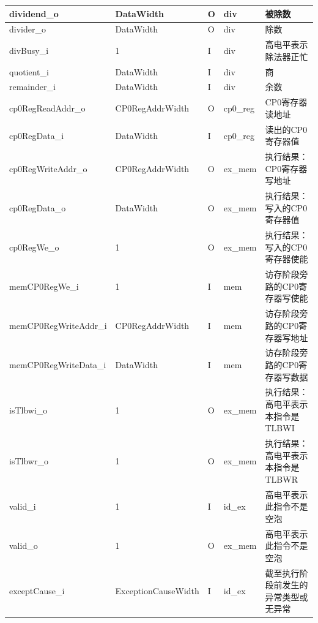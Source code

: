 \documentclass{article}
\begin{document}
\begin{spacing}{1.4}
\begin{longtable}{l|l|l|l|p{5cm}}
\hline dividend\_o             & DataWidth              & O     & div           & 被除数 \\
\hline divider\_o              & DataWidth              & O     & div           & 除数 \\
\hline divBusy\_i              & 1                      & I     & div           & 高电平表示除法器正忙 \\
\hline quotient\_i             & DataWidth              & I     & div           & 商 \\
\hline remainder\_i            & DataWidth              & I     & div           & 余数 \\
\hline cp0RegReadAddr\_o       & CP0RegAddrWidth        & O     & cp0\_reg      & CP0寄存器读地址 \\
\hline cp0RegData\_i           & DataWidth              & I     & cp0\_reg      & 读出的CP0寄存器值 \\
\hline cp0RegWriteAddr\_o      & CP0RegAddrWidth        & O     & ex\_mem       & 执行结果：CP0寄存器写地址 \\
\hline cp0RegData\_o           & DataWidth              & O     & ex\_mem       & 执行结果：写入的CP0寄存器值 \\
\hline cp0RegWe\_o             & 1                      & O     & ex\_mem       & 执行结果：写入的CP0寄存器使能 \\
\hline memCP0RegWe\_i          & 1                      & I     & mem           & 访存阶段旁路的CP0寄存器写使能 \\
\hline memCP0RegWriteAddr\_i   & CP0RegAddrWidth        & I     & mem           & 访存阶段旁路的CP0寄存器写地址 \\
\hline memCP0RegWriteData\_i   & DataWidth              & I     & mem           & 访存阶段旁路的CP0寄存器写数据 \\
\hline isTlbwi\_o              & 1                      & O     & ex\_mem       & 执行结果：高电平表示本指令是TLBWI \\
\hline isTlbwr\_o              & 1                      & O     & ex\_mem       & 执行结果：高电平表示本指令是TLBWR \\
\hline valid\_i                & 1                      & I     & id\_ex        & 高电平表示此指令不是空泡 \\
\hline valid\_o                & 1                      & O     & ex\_mem       & 高电平表示此指令不是空泡 \\
\hline exceptCause\_i          & ExceptionCauseWidth    & I     & id\_ex        & 截至执行阶段前发生的异常类型或无异常 \\

\end{longtable}
\end{spacing}
\end{document}
